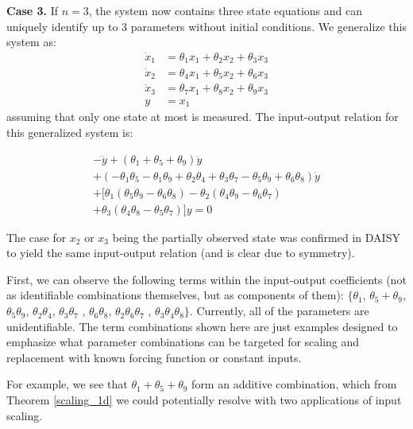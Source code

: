 \documentclass[a4paper,fleqn]{cas-dc}
\theoremstyle{definition}
\begin{document}
\vspace{0.2cm}
\noindent \textbf{Case 3.} If $n=3$, the system now contains three state equations and can uniquely identify up to 3 parameters without initial conditions. 
We generalize this system as:
\begin{align} \label{eq:3d_appendix}
    \dot{x}_1 &= \theta_1 x_1 + \theta_2 x_2  + \theta_3 x_3 \\ \nonumber
    \dot{x}_2 &= \theta_4 x_1 + \theta_5 x_2 + \theta_6 x_3\\ \nonumber
    \dot{x}_3 &= \theta_7 x_1 + \theta_8 x_2 + \theta_9 x_3 \\ \nonumber
    y &= x_1
\end{align}
assuming that only one state at most is measured.
The input-output relation for this generalized system is:
\begin{fleqn}
\begin{multline} \label{eq:io_3d_appendix}
    - \dddot{y} + (\theta_1 + \theta_5 + \theta_9) \ddot{y} \\
    + ( - \theta_1 \theta_5 - \theta_1 \theta_9 + \theta_2 \theta_4 + \theta_3 \theta_7 - \theta_5 \theta_9 + \theta_6 \theta_8) \dot{y} \\
    + \big[\theta_1 (\theta_5 \theta_9 - \theta_6 \theta_8) - \theta_2 (\theta_4 \theta_9 - \theta_6 \theta_7) \\ + \theta_3 (\theta_4 \theta_8 - \theta_5 \theta_7) \big] y = 0
\end{multline}
\end{fleqn}

The case for $x_2$ or $x_3$ being the partially observed state was confirmed in DAISY to yield the same input-output relation (and is clear due to symmetry).

First, we can observe the following terms within the input-output coefficients (not as identifiable combinations themselves, but as components of them): $\{\theta_1$, $\theta_5 + \theta_9$, $\theta_5 \theta_9$, $\theta_2 \theta_4$, $\theta_3 \theta_7$ , $\theta_6 \theta_8$,
$\theta_2 \theta_6 \theta_7$ , $\theta_3 \theta_4 \theta_8\}$. 
Currently, all of the parameters are unidentifiable. The term combinations shown here are just examples designed to emphasize what parameter combinations can be targeted for scaling and replacement with known forcing function or constant inputs.

For example, we see that $\theta_1 + \theta_5 + \theta_9$ form an additive combination, which from Theorem \ref{scaling_1d} we could potentially resolve with two applications of input scaling.
\end{document}
